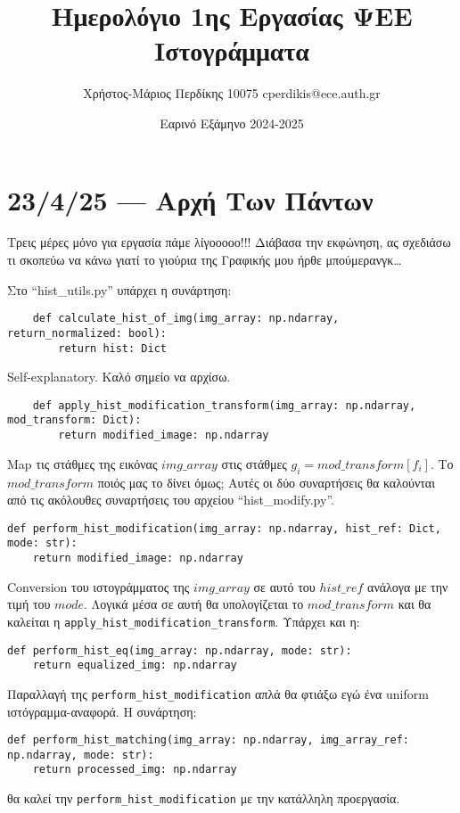 \documentclass{article}
\title{Ημερολόγιο 1ης Εργασίας ΨΕΕ \\ Ιστογράμματα}
\date{Εαρινό Εξάμηνο 2024-2025}
\author{Χρήστος-Μάριος Περδίκης 10075 cperdikis@ece.auth.gr}
\begin{document}
\maketitle

\section{23/4/25 --- Αρχή Των Πάντων}
Τρεις μέρες μόνο για εργασία πάμε λίγοοοοο!!! Διάβασα την εκφώνηση, ας σχεδιάσω 
τι σκοπεύω να κάνω γιατί το γιούρια της Γραφικής μου ήρθε μπούμερανγκ\ldots 

Στο ``hist\_utils.py'' υπάρχει η συνάρτηση:

\begin{verbatim}
    def calculate_hist_of_img(img_array: np.ndarray, return_normalized: bool):
        return hist: Dict
\end{verbatim}
Self-explanatory. Καλό σημείο να αρχίσω.

\begin{verbatim}
    def apply_hist_modification_transform(img_array: np.ndarray, mod_transform: Dict):
        return modified_image: np.ndarray
\end{verbatim}
Map τις στάθμες της εικόνας $img\_array$ στις στάθμες $g_i = mod\_transform
\left[f_i\right]$. Το $mod\_transform$ ποιός μας το δίνει όμως; Αυτές οι δύο 
συναρτήσεις θα καλούνται από τις ακόλουθες συναρτήσεις του αρχείου 
``hist\_modify.py''.

\begin{verbatim}
def perform_hist_modification(img_array: np.ndarray, hist_ref: Dict, mode: str):
    return modified_image: np.ndarray
\end{verbatim}
Conversion του ιστογράμματος της $img\_array$ σε αυτό του $hist\_ref$ ανάλογα 
με την τιμή του $mode$. Λογικά μέσα σε αυτή θα υπολογίζεται το $mod\_transform$
και θα καλείται η \verb|apply_hist_modification_transform|. Υπάρχει και η:

\begin{verbatim}
def perform_hist_eq(img_array: np.ndarray, mode: str):
    return equalized_img: np.ndarray
\end{verbatim}
Παραλλαγή της \verb|perform_hist_modification| απλά θα φτιάξω εγώ ένα uniform
ιστόγραμμα-αναφορά. Η συνάρτηση:

\begin{verbatim}
def perform_hist_matching(img_array: np.ndarray, img_array_ref: np.ndarray, mode: str):
    return processed_img: np.ndarray
\end{verbatim}
θα καλεί την \verb|perform_hist_modification| με την κατάλληλη προεργασία.
\end{document}
